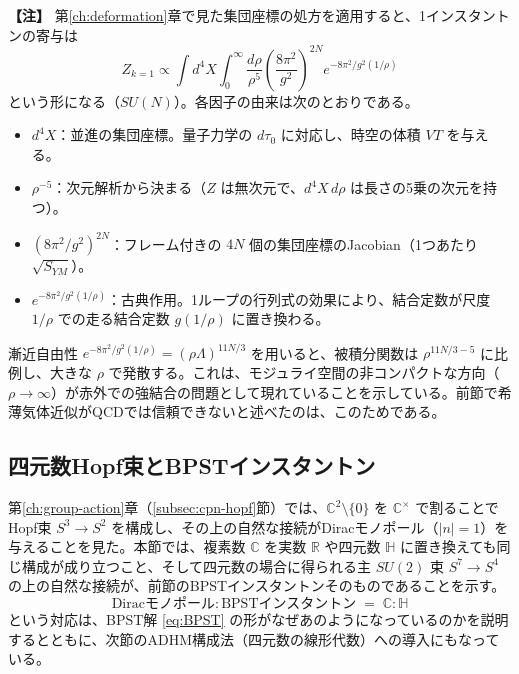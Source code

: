 \documentclass[uplatex, dvipdfmx, book]{jsbook}
\let\origsubsection\subsection
\let\origsubsubsection\subsubsection
\renewcommand{\section}{\origsubsection}
\renewcommand{\subsection}{\origsubsubsection}
\renewcommand{\subsubsection}{\paragraph}
\newenvironment{note}{\vspace{1ex}\par\footnotesize\noindent\textbf{【注】}}{\par\vspace{1ex}}
\begin{document}
\begin{note}
第\ref{ch:deformation}章で見た集団座標の処方を適用すると、1インスタントンの寄与は
\begin{equation*}
    Z_{k=1} \propto \int d^4X \int_0^\infty \frac{d\rho}{\rho^5} \left( \frac{8\pi^2}{g^2} \right)^{2N} e^{-8\pi^2/g^2(1/\rho)}
\end{equation*}
という形になる（$SU(N)$）。各因子の由来は次のとおりである。
\begin{itemize}
    \item $d^4X$：並進の集団座標。量子力学の $d\tau_0$ に対応し、時空の体積 $VT$ を与える。
    \item $\rho^{-5}$：次元解析から決まる（$Z$ は無次元で、$d^4X\,d\rho$ は長さの5乗の次元を持つ）。
    \item $(8\pi^2/g^2)^{2N}$：フレーム付きの $4N$ 個の集団座標のJacobian（1つあたり $\sqrt{S_{YM}}$）。
    \item $e^{-8\pi^2/g^2(1/\rho)}$：古典作用。1ループの行列式の効果により、結合定数が尺度 $1/\rho$ での走る結合定数 $g(1/\rho)$ に置き換わる。
\end{itemize}
漸近自由性 $e^{-8\pi^2/g^2(1/\rho)} = (\rho\Lambda)^{11N/3}$ を用いると、被積分関数は $\rho^{11N/3 - 5}$ に比例し、大きな $\rho$ で発散する。これは、モジュライ空間の非コンパクトな方向（$\rho \to \infty$）が赤外での強結合の問題として現れていることを示している。前節で希薄気体近似がQCDでは信頼できないと述べたのは、このためである。
\end{note}

\section{四元数Hopf束とBPSTインスタントン}
\label{sec:quaternion-hopf}

第\ref{ch:group-action}章（\ref{subsec:cpn-hopf}節）では、$\mathbb{C}^2 \setminus \{0\}$ を $\mathbb{C}^\times$ で割ることでHopf束 $S^3 \to S^2$ を構成し、その上の自然な接続がDiracモノポール（$|n| = 1$）を与えることを見た。本節では、複素数 $\mathbb{C}$ を実数 $\mathbb{R}$ や四元数 $\mathbb{H}$ に置き換えても同じ構成が成り立つこと、そして四元数の場合に得られる主 $SU(2)$ 束 $S^7 \to S^4$ の上の自然な接続が、前節のBPSTインスタントンそのものであることを示す。
\begin{equation*}
    \text{Diracモノポール} : \text{BPSTインスタントン} \;=\; \mathbb{C} : \mathbb{H}
\end{equation*}
という対応は、BPST解 \eqref{eq:BPST} の形がなぜあのようになっているのかを説明するとともに、次節のADHM構成法（四元数の線形代数）への導入にもなっている。
\end{document}
